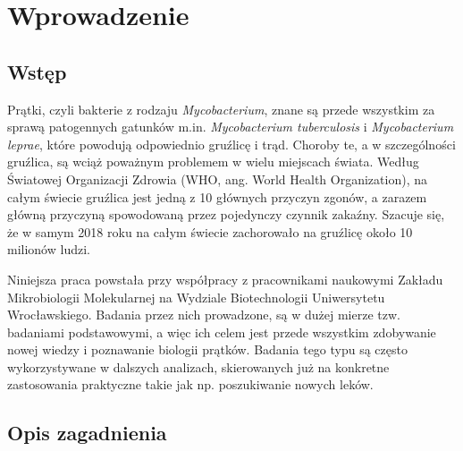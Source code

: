 \documentclass[declaration,shortabstract,mgr]{iithesis}
\author         {Artur Rosa}
\begin{document}



\chapter{Wprowadzenie}



\section{Wstęp}

Prątki, czyli bakterie z rodzaju \emph{Mycobacterium}, znane są przede wszystkim za sprawą patogennych gatunków m.in. \emph{Mycobacterium tuberculosis} i \emph{Mycobacterium leprae}, które powodują odpowiednio gruźlicę i trąd. Choroby te, a w szczególności gruźlica, są wciąż poważnym problemem w wielu miejscach świata. Według Światowej Organizacji Zdrowia (WHO, ang. World Health Organization), na całym świecie gruźlica jest jedną z 10 głównych przyczyn zgonów, a zarazem główną przyczyną spowodowaną przez pojedynczy czynnik zakaźny\cite{who-stats}. Szacuje się, że w samym 2018 roku na całym świecie zachorowało na gruźlicę około 10 milionów ludzi.

Niniejsza praca powstała przy współpracy z pracownikami naukowymi Zakładu Mikrobiologii Molekularnej na Wydziale Biotechnologii Uniwersytetu Wrocławskiego. Badania przez nich prowadzone, są w dużej mierze tzw. badaniami podstawowymi, a więc ich celem jest przede wszystkim zdobywanie nowej wiedzy i poznawanie biologii prątków. Badania tego typu są często wykorzystywane w dalszych analizach, skierowanych już na konkretne zastosowania praktyczne takie jak np. poszukiwanie nowych leków.


\section{Opis zagadnienia}
\label{sec:intro-description}
\end{document}
